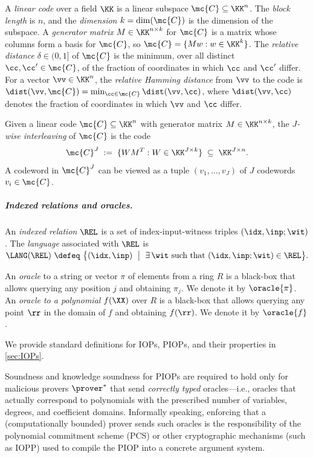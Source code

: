 A \emph{linear code} over a field  $\KK$ is a linear subspace $\mc{C}\subseteq \KK^n$.
The \emph{block length} is $n$, and the \emph{dimension} $k=\dim(\mc{C})$ is the dimension of the subspace.
A \emph{generator matrix} $M\in \KK^{n\times k}$ for $\mc{C}$ is a matrix whose columns form a basis for $\mc{C}$, so $\mc{C}=\{Mw : w\in \KK^k\}$.
 The \emph{relative distance} $\delta\in(0,1]$ of $\mc{C}$ is the minimum, over all distinct $\cc,\cc'\in\mc{C}$, of the fraction of coordinates in which $\cc$ and $\cc'$ differ.
For a vector $\vv\in \KK^n$, the \emph{relative Hamming distance} from $\vv$ to the code is $\dist(\vv,\mc{C})=\min_{\cc\in\mc{C}}\dist(\vv,\cc)$, where $\dist(\vv,\cc)$ denotes the fraction of coordinates in which $\vv$ and $\cc$ differ.

Given a linear code $\mc{C}\subseteq \KK^n$ with generator matrix $M\in \KK^{n\times k}$, the \emph{$J$-wise interleaving} of $\mc{C}$ is the code
\[
  \mc{C}^J \;:=\; \{WM^T : W\in \KK^{J\times k}\} \;\subseteq\; \KK^{J\times n}.
\]
A codeword in $\mc{C}^J$ can be viewed as a tuple $(v_1,\ldots,v_J)$ of $J$ codewords $v_i\in\mc{C}$.

\subparagraph{Indexed relations and oracles.}
\label{sec:zinc-crypto-polynomial-commitments}


An \emph{indexed relation} $\REL$ is a set of index-input-witness triples $(\idx,\inp;\wit)$. The \emph{language} associated with $\REL$ is
\(
  \LANG(\REL)\ \defeq\ \bigl\{(\idx,\inp)\ \bigm|\ \exists\,\wit \text{ such that } (\idx,\inp;\wit)\in\REL\bigr\}.
\)



An \emph{oracle} to a string or vector $\pi$ of elements from a ring $R$ is a black-box that allows querying any position $j$ and obtaining $\pi_j$. We denote it by $\oracle{\pi}$. 
An \emph{oracle to a polynomial} $f(\XX)$ over $R$ is a black-box that allows querying any point $\rr$ in the domain of $f$ and obtaining $f(\rr)$. We denote it by $\oracle{f}$.

We provide standard definitions for IOPs, PIOPs, and their properties in \cref{sec:IOPs}. 

\begin{remark}
\label{rem:zinc-crypto-oracle_typing}
Soundness and knowledge soundness for PIOPs are required to hold only for malicious provers $\prover^*$ that send \emph{correctly typed} oracles---i.e., oracles that actually correspond to polynomials with the prescribed number of variables, degrees, and coefficient domains. Informally speaking, enforcing that a (computationally bounded) prover sends such oracles is the responsibility of the polynomial commitment scheme (PCS) or other cryptographic mechanisms (such as IOPP) used to compile the PIOP into a concrete argument system.
\end{remark}






